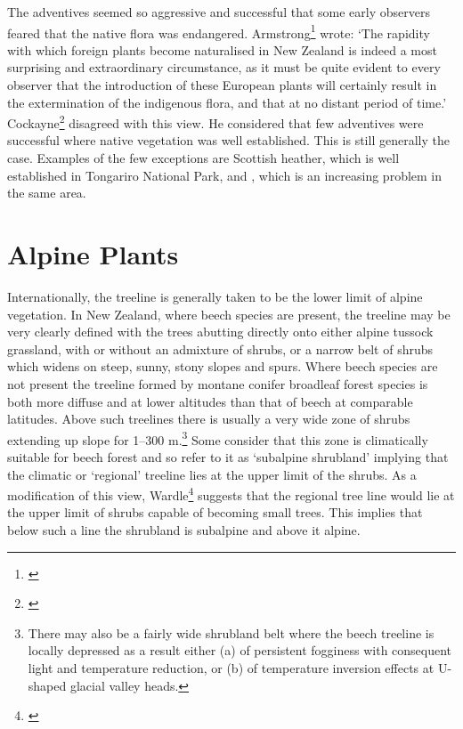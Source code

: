 The adventives seemed so aggressive and successful that some early observers feared that the native flora was endangered.
Armstrong\footnote{\cite{armstrong1872naturalised}} wrote: `The rapidity with which foreign plants become naturalised in New Zealand is indeed a most surprising and extraordinary circumstance, as it must be quite evident to every observer that the introduction of these European plants will certainly result in the extermination of the indigenous flora, and that at no distant period of time.' Cockayne\footnote{\cite{cockayne1967plants}} disagreed with this view.
He considered that few adventives were successful where native vegetation was well established.
This is still generally the case.
Examples of the few exceptions are Scottish heather, which is well established in Tongariro National Park, and , which is an increasing problem in the same area.

\chapter{Alpine Plants}

Internationally, the treeline is generally taken to be the lower limit of alpine vegetation.
In New Zealand, where beech species are present, the treeline may be very clearly defined with the trees abutting directly onto either alpine tussock grassland, with or without an admixture of shrubs, or a narrow belt of shrubs which widens on steep, sunny, stony slopes and spurs.
Where beech species are not present the treeline formed by montane conifer broadleaf forest species is both more diffuse and at lower altitudes than that of beech at comparable latitudes.
Above such treelines there is usually a very wide zone of shrubs extending up slope for 1--300 m.\footnote{There may also be a fairly wide shrubland belt where the beech treeline is locally depressed as a result either (a) of persistent fogginess with consequent light and temperature reduction, or (b) of temperature inversion effects at U-shaped glacial valley heads.}
Some consider that this zone is climatically suitable for beech forest and so refer to it as `subalpine shrubland' implying that the climatic or `regional' treeline lies at the upper limit of the shrubs.
As a modification of this view, Wardle\footnote{\cite{wardle1965comparison}} suggests that the regional tree line would lie at the upper limit of shrubs capable of becoming small trees.
This implies that below such a line the shrubland is subalpine and above it alpine.

